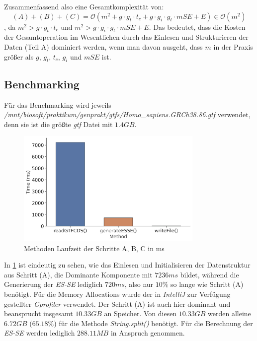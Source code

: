 \documentclass[12pt]{article}
\begin{document}
Zusammenfassend also eine Gesamtkomplexität von:
\begin{equation}
    (A) + (B) + (C) = \mathcal{O}( m^{2} + g \cdot g_{t} \cdot t_{c} + g \cdot g_{i} \cdot g_{t} \cdot mSE + E) \in \mathcal{O}(m^{2})
\end{equation}
, da $m^{2} > g \cdot g_{t} \cdot t_{c}$ und $m^{2} > g \cdot g_{i} \cdot g_{t} \cdot mSE + E$.
Das bedeutet, dass die Kosten der Gesamtoperation im Wesentlichen durch das Einlesen und Strukturieren der Daten (Teil A) dominiert werden, 
wenn man davon ausgeht, dass $m$ in der Praxis größer als $g$, $g_{t}$, $t_{c}$, $g_{i}$ und $mSE$ ist.

\subsection{Benchmarking}
Für das Benchmarking wird jeweils \textit{/mnt/biosoft/praktikum/genprakt/gtfs/Homo\_sapiens.GRCh38.86.gtf} verwendet, denn
sie ist die grö\ss te \textit{gtf} Datei mit $1.4GB$.

\begin{figure}[htpb]
    \centering
    \includegraphics[width=0.8\textwidth]{./plots/benchmark_time.jpg}
    \caption{Methoden Laufzeit der Schritte A, B, C in ms}
    \label{fig:-plots-benchmark_time-jpg}
\end{figure}

In \ref{fig:-plots-benchmark_time-jpg} ist eindeutig zu sehen, wie das Einlesen und Initialisieren 
der Datenstruktur aus Schritt (A), die Dominante Komponente mit $7236ms$ bildet, während die Generierung der
\textit{ES-SE} lediglich $720ms$, also nur $10\%$ so lange wie Schritt (A) benötigt. 
Für die Memory Allocations wurde der in \textit{IntelliJ} zur Verfügung gestellter \textit{Gprofiler} verwendet.
Der Schritt (A) ist auch hier dominant und beansprucht insgesamt $10.33GB$ an Speicher. 
Von diesen $10.33GB$ werden alleine $6.72GB$ ($65.18\%$) für die Methode \textit{String.split()} benötigt.
Für die Berechnung der \textit{ES-SE} werden lediglich $288.11MB$ in Anspruch genommen.
\end{document}
